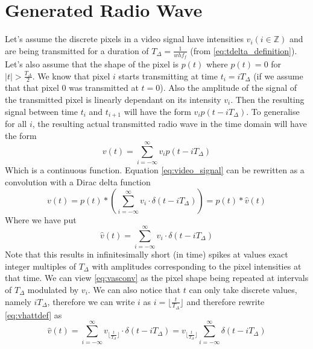 \documentclass[a4paper,12pt,twoside,openright]{report}
\begin{document}
\section{Generated Radio Wave}

Let's assume the discrete pixels in a video signal have intensities $v_{i} (i \in \mathbb{Z})$ and are being transmitted for a duration of $T_{\Delta}=\frac{1}{w h f_{f}}$ (from \ref{eq:tdelta_definition}). Let's also assume that the shape of the pixel is $p(t)$ where $p(t)=0$ for $|t| > \frac{T_{\Delta}}{2}$. We know that pixel $i$ starts transmitting at time $t_{i}=i T_{\Delta}$ (if we assume that that pixel 0 was transmitted at $t=0$). Also the amplitude of the signal of the transmitted pixel is linearly dependant on its intensity $v_{i}$. Then the resulting signal between time $t_{i}$ and $t_{i+1}$ will have the form $v_{i} p(t-i T_{\Delta})$. To generalise for all $i$, the resulting actual transmitted radio wave in the time domain will have the form 
\begin{equation}
\label{eq:video_signal}
v(t) = \sum\limits_{i=-\infty}^{\infty} v_{i} p(t-i T_{\Delta})
\end{equation}
Which is a continuous function. Equation \ref{eq:video_signal} can be rewritten as a convolution with a Dirac delta function
\begin{equation}
\label{eq:vasconv}
v(t) = p(t) \ast \left( \sum\limits_{i=-\infty}^{\infty} v_{i} \cdot \delta(t-i T_{\Delta}) \right) = p(t) \ast \hat{v}(t)
\end{equation}
Where we have put
\begin{equation}
\label{eq:vhattdef}
\hat{v}(t) = \sum\limits_{i=-\infty}^{\infty} v_{i} \cdot \delta(t-i T_{\Delta})
\end{equation}
Note that this results in infinitesimally short (in time) spikes at values exact integer multiples of $T_{\Delta}$ with amplitudes corresponding to the pixel intensities at that time. We can view \ref{eq:vasconv} as the pixel shape being repeated at intervals of $T_{\Delta}$ modulated by $v_{i}$. We can also notice that $t$ can only take discrete values, namely  $i T_{\Delta}$, therefore we can write $i$ as $i = \lfloor \frac{t}{T_{\Delta}} \rfloor$ and therefore rewrite \ref{eq:vhattdef} as
\begin{equation}
\hat{v}(t) = \sum\limits_{i=-\infty}^{\infty} v_{ \lfloor \frac{t}{T_{\Delta}} \rfloor } \cdot \delta(t-i T_{\Delta}) = v_{ \lfloor \frac{t}{T_{\Delta}} \rfloor } \sum\limits_{i=-\infty}^{\infty} \delta(t-i T_{\Delta})
\end{equation}
\end{document}
